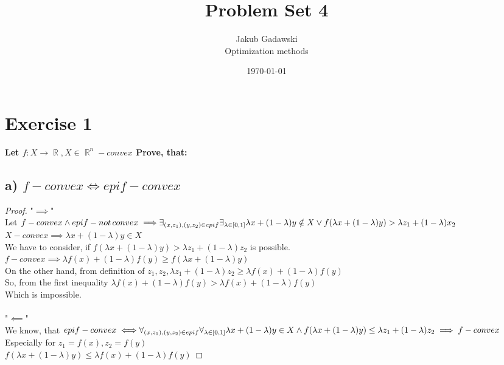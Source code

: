 \documentclass[12pt]{article}
\title{Problem Set 4}
\author{Jakub Gadawski\\ 
Optimization methods
}
\date{\today}
\DeclareMathOperator{\R}{\mathbb{R}}
\begin{document}
\setlength{\droptitle}{-5em}
\maketitle

\section*{Exercise 1}
{\bfseries Let \(f:X\rightarrow\R, X\in \R^n -convex \) Prove, that:}
\subsection*{a) \( f- convex \iff epi f -convex\)}
\begin{proof}
    "\(\implies\)"\\
    Let \( f - convex \land epi f- not\,convex \implies \\ \exists_{(x, z_1), (y, z_2) \in epi f} \exists_{\lambda \in [0,1]} \lambda x+(1-\lambda) y \notin X \lor f(\lambda x +(1- \lambda)y) > \lambda z_1 + (1-\lambda) x_2\)\\
    \( X -convex \implies \lambda x+(1-\lambda) y \in X\)\\
    We have to consider, if \( f(\lambda x +(1- \lambda)y) > \lambda z_1 + (1-\lambda) z_2  \) is possible.\\
    \( f- convex \implies \lambda f(x) + (1-\lambda) f(y) \geq f(\lambda x +(1- \lambda)y) \)\\
    On the other hand, from definition of \(z_1, z_2, \lambda z_1 + (1-\lambda) z_2 \geq \lambda f(x) + (1-\lambda) f(y)\) \\
    So, from the first inequality \(\lambda f(x) + (1-\lambda) f(y)>\lambda f(x) + (1-\lambda) f(y) \)\\
    Which is impossible.\\ \\
    "\(\impliedby\)"\\
    We know, that \( epi f - convex \iff  \\ \forall_{(x,z_1), (y, z_2) \in epi f} \forall_{\lambda \in [0,1]} \lambda x + (1- \lambda) y \in X \land f(\lambda x + (1- \lambda) y)\leq \lambda z_1 + (1- \lambda) z_2 \implies f- convex\) \\
    Especially for \(z_1 = f(x), z_2=f(y)\)\\
    \( f(\lambda x + (1- \lambda) y)\leq \lambda f(x) + (1- \lambda) f(y) \)
\end{proof}
\end{document}

